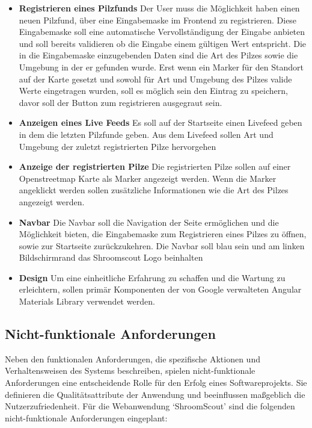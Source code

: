 \documentclass[../main.tex]{subfiles} %
\begin{document}
\begin{itemize}

	\item \textbf{Registrieren eines Pilzfunds}
	      Der User muss die Möglichkeit haben einen neuen Pilzfund, über eine Eingabemaske im Frontend zu registrieren.
		  Diese Eingabemaske soll eine automatische Vervollständigung der Eingabe anbieten und soll bereits validieren ob die Eingabe einem gültigen
		  Wert entspricht. Die in die Eingabemaske einzugebenden Daten sind die Art des Pilzes sowie die Umgebung in der er gefunden wurde.
		  Erst wenn ein Marker für den Standort auf der Karte gesetzt und sowohl für Art und Umgebung des Pilzes valide Werte eingetragen wurden, soll es 
		  möglich sein den Eintrag zu speichern, davor soll der Button zum registrieren ausgegraut sein.

	\item \textbf{Anzeigen eines Live Feeds}
	      Es soll auf der Startseite einen Livefeed geben in dem die letzten Pilzfunde geben. 
		  Aus dem Livefeed sollen Art und Umgebung der zuletzt registrierten Pilze hervorgehen

	\item \textbf{Anzeige der registrierten Pilze}
		  Die registrierten Pilze sollen auf einer Openstreetmap Karte als Marker angezeigt werden.
		  Wenn die Marker angeklickt werden sollen zusätzliche Informationen wie die Art des Pilzes angezeigt werden.
	      

	\item \textbf{Navbar}
	      Die Navbar soll die Navigation der Seite ermöglichen und die Möglichkeit bieten, die Eingabemaske zum Registrieren eines Pilzes zu öffnen, sowie zur Startseite zurückzukehren.
		  Die Navbar soll blau sein und am linken Bildschirmrand das Shroomscout Logo beinhalten

	\item \textbf{Design}
	      Um eine einheitliche Erfahrung zu schaffen und die Wartung zu erleichtern, sollen primär Komponenten der von Google verwalteten Angular Materials Library verwendet werden.

\end{itemize}


\subsection{Nicht-funktionale Anforderungen}

Neben den funktionalen Anforderungen, die spezifische Aktionen und Verhaltensweisen des Systems beschreiben, spielen
nicht-funktionale Anforderungen eine entscheidende Rolle für den Erfolg eines Softwareprojekts. Sie definieren die
Qualitätsattribute der Anwendung und beeinflussen maßgeblich die Nutzerzufriedenheit. Für die Webanwendung `ShroomScout'
sind die folgenden nicht-funktionale Anforderungen eingeplant:
\end{document}
